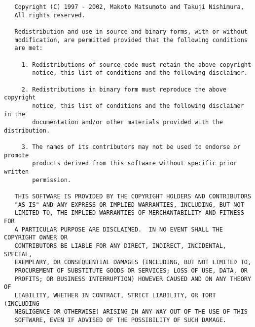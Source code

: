 \begin{verbatim}
   Copyright (C) 1997 - 2002, Makoto Matsumoto and Takuji Nishimura,
   All rights reserved.                          

   Redistribution and use in source and binary forms, with or without
   modification, are permitted provided that the following conditions
   are met:

     1. Redistributions of source code must retain the above copyright
        notice, this list of conditions and the following disclaimer.

     2. Redistributions in binary form must reproduce the above copyright
        notice, this list of conditions and the following disclaimer in the
        documentation and/or other materials provided with the distribution.

     3. The names of its contributors may not be used to endorse or promote 
        products derived from this software without specific prior written 
        permission.

   THIS SOFTWARE IS PROVIDED BY THE COPYRIGHT HOLDERS AND CONTRIBUTORS
   "AS IS" AND ANY EXPRESS OR IMPLIED WARRANTIES, INCLUDING, BUT NOT
   LIMITED TO, THE IMPLIED WARRANTIES OF MERCHANTABILITY AND FITNESS FOR
   A PARTICULAR PURPOSE ARE DISCLAIMED.  IN NO EVENT SHALL THE COPYRIGHT OWNER OR
   CONTRIBUTORS BE LIABLE FOR ANY DIRECT, INDIRECT, INCIDENTAL, SPECIAL,
   EXEMPLARY, OR CONSEQUENTIAL DAMAGES (INCLUDING, BUT NOT LIMITED TO,
   PROCUREMENT OF SUBSTITUTE GOODS OR SERVICES; LOSS OF USE, DATA, OR
   PROFITS; OR BUSINESS INTERRUPTION) HOWEVER CAUSED AND ON ANY THEORY OF
   LIABILITY, WHETHER IN CONTRACT, STRICT LIABILITY, OR TORT (INCLUDING
   NEGLIGENCE OR OTHERWISE) ARISING IN ANY WAY OUT OF THE USE OF THIS
   SOFTWARE, EVEN IF ADVISED OF THE POSSIBILITY OF SUCH DAMAGE.
\end{verbatim}
